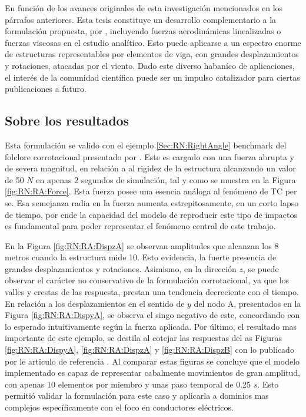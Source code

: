 En función de los avances originales de esta investigación mencionados en los párrafos anteriores. Esta tesis constituye un desarrollo complementario a la formulación propuesta, por \cite{Le2014}, incluyendo fuerzas aerodinámicas linealizadas o fuerzas viscosas en el estudio analítico. Esto puede aplicarse a un espectro enorme de estructuras representables por elementos de viga, con grandes desplazamientos y rotaciones, atacadas por el viento. Dado este diverso habaníco de aplicaciones, el interés de la comunidad científica puede ser un impulso catalizador para ciertas publicaciones a futuro.


\subsection{Sobre los resultados}

Esta formulación se valido con el ejemplo \ref{Sec:RN:RightAngle} benchmark del folclore corrotacional presentado por \cite{simo1988dynamics}. Este es cargado con una fuerza abrupta y de severa magnitud, en relación  a al  rigidez de la estructura alcanzando un valor de 50 $N$ en apenas 2 segundos de simulación, tal y como se muestra en la Figura \ref{fig:RN:RA:Force}. Esta fuerza posee una esencia análoga al fenómeno de TC per se. Esa semejanza radia en la fuerza aumenta estrepitosamente, en un corto lapso de tiempo, por ende la capacidad del modelo de reproducir este tipo de impactos es fundamental para poder representar el fenómeno central de este trabajo.

 En la Figura \ref{fig:RN:RA:DispzA} se observan amplitudes que alcanzan los 8 metros cuando la estructura mide 10. Esto evidencia, la fuerte presencia de grandes desplazamientos y rotaciones. Asimismo, en la dirección $z$, se puede observar el carácter no conservativo de la formulación corrotacional, ya que los valles y crestas de las respuesta, prestan una tendencia decreciente con el tiempo. En relación a los desplazamientos en el sentido de $y$ del nodo A, presentados en la Figura \ref{fig:RN:RA:DispyA}, se observa el singo negativo de este, concordando con lo esperado intuitivamente según la fuerza aplicada. Por último, el resultado mas importante de este ejemplo, se destila al cotejar las respuestas del as Figuras \ref{fig:RN:RA:DispyA}, \ref{fig:RN:RA:DispzA} y \ref{fig:RN:RA:DispzB} con lo publicado por le articulo de referencia \citep{Le2014}. Al comparar estas figuras se concluye que el modelo implementado es capaz de representar cabalmente movimientos de gran amplitud, con apenas 10 elementos por miembro y unas paso temporal de 0.25 $s$. Esto permitió validar la formulación para este caso y aplicarla a dominios mas complejos específicamente con el foco en conductores eléctricos. 

